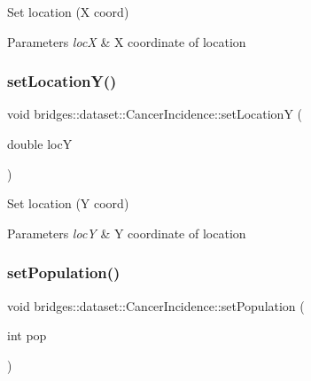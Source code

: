 Set location (X coord) 


\begin{DoxyParams}{Parameters}
{\em locX} & X coordinate of location \\
\hline
\end{DoxyParams}
\mbox{\label{classbridges_1_1dataset_1_1_cancer_incidence_ab18e0703f97909a0a37c5e9a3460736a}} 
\subsubsection{\texorpdfstring{setLocationY()}{setLocationY()}}
{\footnotesize\ttfamily void bridges\+::dataset\+::\+Cancer\+Incidence\+::set\+LocationY (\begin{DoxyParamCaption}\item[{double}]{locY }\end{DoxyParamCaption})\hspace{0.3cm}{\ttfamily [inline]}}



Set location (Y coord) 


\begin{DoxyParams}{Parameters}
{\em locY} & Y coordinate of location \\
\hline
\end{DoxyParams}
\mbox{\label{classbridges_1_1dataset_1_1_cancer_incidence_a468eae18b9af44a25fe3f586283875e4}} 
\subsubsection{\texorpdfstring{setPopulation()}{setPopulation()}}
{\footnotesize\ttfamily void bridges\+::dataset\+::\+Cancer\+Incidence\+::set\+Population (\begin{DoxyParamCaption}\item[{int}]{pop }\end{DoxyParamCaption})\hspace{0.3cm}{\ttfamily [inline]}}



